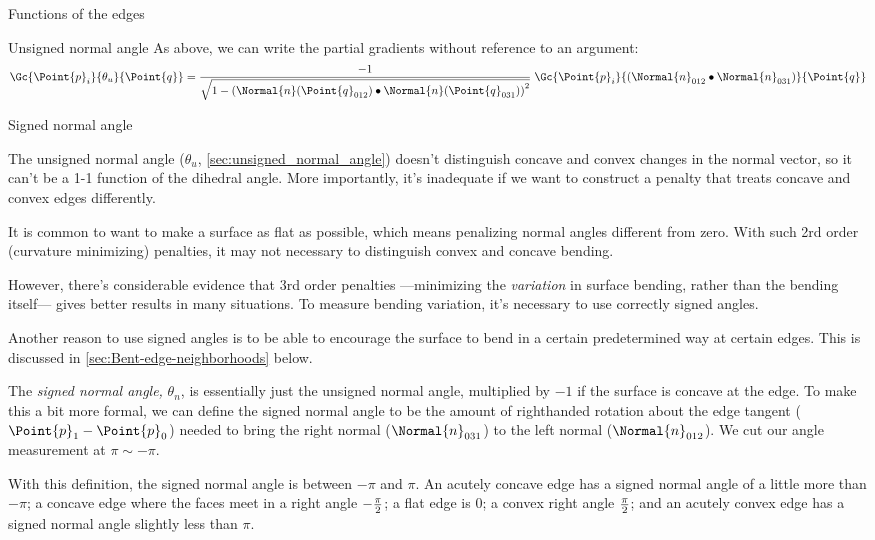 \begin{plSection}{Functions of the edges}
\begin{plSection}{Unsigned normal angle}
As above, we can write the partial gradients without reference to an argument:
\begin{equation}
\Gc{\Point{p}_i}{\theta_u}{\Point{q}}
=
{ -1 \over \sqrt{1 - \left( \Normal{n}(\Point{q}_{012}) \bullet \Normal{n}(\Point{q}_{031}) \right)^2} }
\; \Gc{\Point{p}_i}{\left(\Normal{n}_{012}\bullet\Normal{n}_{031}\right)}{\Point{q}}
\end{equation}

\end{plSection}%

\begin{plSection}{Signed normal angle}
\label{sec:signed_normal_angle}

The unsigned normal angle
($\theta_u$, \cref{sec:unsigned_normal_angle})
doesn't distinguish concave and convex changes in the normal vector,
so it can't be a 1-1 function of the dihedral angle.
More importantly, it's inadequate if we want to construct
a penalty that treats concave and convex edges differently.

It is common to want to make a surface as flat as possible,
which means penalizing normal angles different from zero.
With such 2rd order (curvature minimizing) penalties, 
it may not necessary to distinguish
convex and concave bending.

However, there's considerable evidence that
$3$rd order penalties ---minimizing the {\it variation}
in surface bending, rather than the bending itself---
gives better results in many situations.
To measure bending variation, it's necessary
to use correctly signed angles.

Another reason to use signed angles is to be able
to encourage the surface to bend in a certain
predetermined way at certain edges.
This is discussed in \cref{sec:Bent-edge-neighborhoods}
below.

The {\it signed normal angle,} $\theta_n$,
is essentially just the
unsigned normal angle, multiplied by $-1$ if the surface is
concave at the edge.
To make this a bit more formal,
we can define the signed normal angle to be the amount
of righthanded rotation about the edge tangent ($\Point{p}_1 - \Point{p}_0$)
needed to bring the right normal ($\Normal{n}_{031}$) to
the left normal ($\Normal{n}_{012}$).
We cut our angle measurement at $\pi \sim -\pi$.

With this definition, the signed normal angle
is between $-\pi$ and $\pi$.
An acutely concave edge has a signed normal angle
of a little more than $-\pi$;
a concave edge where the faces meet in a right angle
$-{\pi \over 2}$;
a flat edge is $0$;
a convex right angle $\pi \over 2$;
and an acutely convex edge has a signed normal angle
slightly less than $\pi$.


\end{plSection}
\end{plSection}
